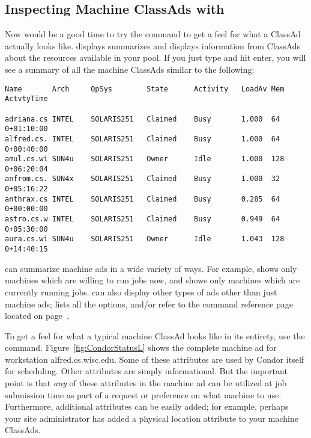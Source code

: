 \subsection{Inspecting Machine ClassAds with }

Now would be a good time to try the  command to get a feel
for what a ClassAd actually looks like.
 displays summarizes and displays information from
ClassAds about the resources available in your pool. If you just type
 and hit enter, you will see a summary of all the machine
ClassAds similar to the following:
\begin{center}
\begin{verbatim}
Name       Arch     OpSys        State      Activity   LoadAv Mem  ActvtyTime

adriana.cs INTEL    SOLARIS251   Claimed    Busy       1.000  64    0+01:10:00
alfred.cs. INTEL    SOLARIS251   Claimed    Busy       1.000  64    0+00:40:00
amul.cs.wi SUN4u    SOLARIS251   Owner      Idle       1.000  128   0+06:20:04
anfrom.cs. SUN4x    SOLARIS251   Claimed    Busy       1.000  32    0+05:16:22
anthrax.cs INTEL    SOLARIS251   Claimed    Busy       0.285  64    0+00:00:00
astro.cs.w INTEL    SOLARIS251   Claimed    Busy       0.949  64    0+05:30:00
aura.cs.wi SUN4u    SOLARIS251   Owner      Idle       1.043  128   0+14:40:15
\end{verbatim}
\Dots 
\end{center}


 can summarize machine ads in a wide variety of ways.
For example,  shows only machines which are
willing to run jobs now, and  shows only machines
which are currently running jobs.   can also display
other types of ads other than just machine ads; 
lists all the options, and/or refer to the  command
reference page located on page~\pageref{man-condor-status}.

To get a feel for what a typical machine ClassAd looks like in its
entirety, use the  command.
Figure~\ref{fig:CondorStatusL} shows the complete machine ad for
workstation alfred.cs.wisc.edu. Some of these attributes are used by
Condor itself for scheduling. Other attributes are simply informational.
But the important point is that \textit{any} of these attributes in the
machine ad can be utilized at job submission time as part of a request
or preference on what machine to use. Furthermore, additional attributes
can be easily added; for example, perhaps your site administrator has
added a physical location attribute to your machine ClassAds.


